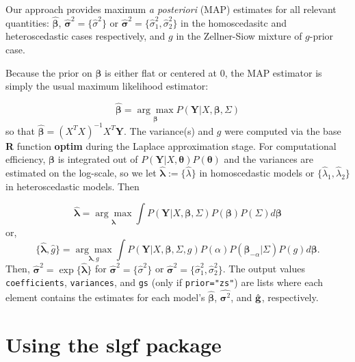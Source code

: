 Our approach provides maximum \textit{a posteriori} (MAP) estimates for all relevant quantities: $\hat{\boldsymbol{\beta}}$, $\hat{\boldsymbol{\sigma}}^2=\{\hat{\sigma}^2\}$ or $\hat{\boldsymbol{\sigma}}^2=\{\hat{\sigma}^2_1,\hat{\sigma}^2_2\}$ in the homoscedasitc and heteroscedastic cases respectively, and $g$ in the Zellner-Siow mixture of $g$-prior case. 

Because the prior on $\boldsymbol{\beta}$ is either flat or centered at 0, the MAP estimator is simply the usual maximum likelihood estimator:

\begin{equation}
\hat{\boldsymbol{\beta}}=\underset{\boldsymbol{\beta}}{\arg\max}P(\boldsymbol{Y}|X,\boldsymbol{\beta},\Sigma) 
\end{equation}
so that $\hat{\boldsymbol{\beta}}=(X^TX)^{-1}X^T\boldsymbol{Y}$. The variance(s) and $g$ were computed via the base \textbf{R} function \textbf{optim} during the Laplace approximation stage. For computational efficiency, ${\boldsymbol{\beta}}$ is integrated out of $P(\boldsymbol{Y}|X,\boldsymbol{\theta})P(\boldsymbol{\theta})$ and the variances are estimated on the log-scale, so we let $\hat{\boldsymbol{\lambda}}:=\{\hat{\lambda}\}$ in homoscedastic models or $\{\hat{\lambda}_1,\hat{\lambda}_2\}$ in heteroscedastic models. Then

\begin{equation}
\hat{\boldsymbol{\lambda}}=\underset{\boldsymbol{\lambda}}{\arg\max}\int P(\bm{Y}|X,\boldsymbol{\beta},\Sigma)P(\boldsymbol{\beta})P(\Sigma)d\boldsymbol{\beta}
\end{equation}
or, 
\begin{equation}
\{\hat{\boldsymbol{\lambda}},\hat{g}\}=\underset{\boldsymbol{\lambda},g}{\arg\max}\int P(\bm{Y}|X,\boldsymbol{\beta},\Sigma,g)P(\alpha)P(\boldsymbol{\beta}_{-\alpha}|\Sigma)P(g)d\boldsymbol{\beta}.
\end{equation}
Then, $\hat{\boldsymbol{\sigma}}^2=\exp\{\hat{\boldsymbol{\lambda}}\}$ for $\hat{\boldsymbol{\sigma}}^2=\{\hat{\sigma}^2\}$ or $\hat{\boldsymbol{\sigma}}^2=\{\hat{\sigma}^2_1,\hat{\sigma}^2_2\}$. The output values \texttt{coefficients}, \texttt{variances}, and \texttt{gs} (only if \texttt{prior="zs"}) are lists where each element contains the estimates for each model's  $\hat{\boldsymbol{\beta}}$, $\hat{\boldsymbol{\sigma}^2}$, and $\hat{\bf{g}}$, respectively. 

\section{Using the slgf package}\hypertarget{section:package}{}

